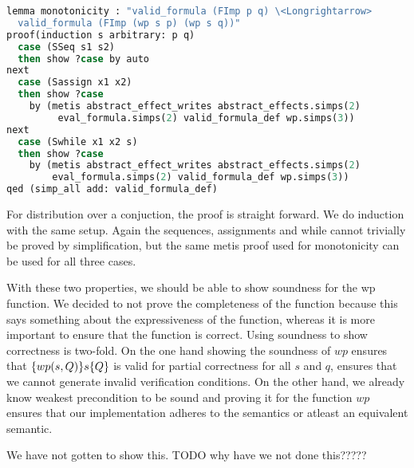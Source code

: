 \begin{lstlisting}[caption={Proof of monotonicity in Isabelle},label={lst:isamono},language=sml]
lemma monotonicity : "valid_formula (FImp p q) \<Longrightarrow>
  valid_formula (FImp (wp s p) (wp s q))"
proof(induction s arbitrary: p q)
  case (SSeq s1 s2)
  then show ?case by auto
next
  case (Sassign x1 x2)
  then show ?case
    by (metis abstract_effect_writes abstract_effects.simps(2)
         eval_formula.simps(2) valid_formula_def wp.simps(3))
next
  case (Swhile x1 x2 s)
  then show ?case
    by (metis abstract_effect_writes abstract_effects.simps(2)
        eval_formula.simps(2) valid_formula_def wp.simps(3))
qed (simp_all add: valid_formula_def)
\end{lstlisting}

For distribution over a conjuction, the proof is straight forward.
We do induction with the same setup.
Again the sequences, assignments and while cannot trivially be proved by simplification,
but the same metis proof used for monotonicity can be used for all three cases.

With these two properties, we should be able to show soundness for the wp function.
We decided to not prove the completeness of the function because this says something about the expressiveness of the function, whereas it is more important to ensure that
the function is correct.
Using soundness to show correctness is two-fold.
On the one hand showing the soundness of $wp$ ensures that $\{wp(s,Q)\}s\{Q\}$ is valid for partial correctness for all $s$ and $q$, ensures that we cannot generate invalid verification conditions.
On the other hand, we already know weakest precondition to be sound and proving it for the function $wp$ ensures that our implementation adheres to the semantics or atleast an equivalent semantic.

We have not gotten to show this.
TODO why have we not done this?????